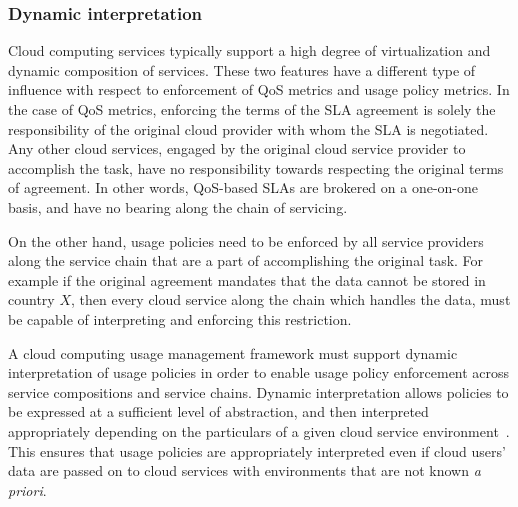 \documentclass[10pt, conference, compsocconf]{IEEEtran}
\begin{document}





\subsubsection{Dynamic interpretation}
Cloud computing services typically support a high degree of virtualization and dynamic composition of services. These two features have a different type of influence with respect to enforcement of QoS metrics and usage policy metrics. In the case of QoS metrics, enforcing the terms of the SLA agreement is solely the responsibility of the original cloud provider with whom the SLA is negotiated. Any other cloud services, engaged by the original cloud service provider to accomplish the task, have no responsibility towards respecting the original terms of agreement. In other words, QoS-based SLAs are brokered on a one-on-one basis, and have no bearing along the chain of servicing. 

On the other hand, usage policies need to be enforced by all service providers along the service chain that are a part of accomplishing the original task. For example if the original agreement mandates that the data cannot be stored in country $X$, then every cloud service along the chain which handles the data, must be capable of interpreting and enforcing this restriction. 

A cloud computing usage management framework must support dynamic interpretation of usage policies in order to enable usage policy enforcement across  service compositions and service chains. Dynamic interpretation allows policies to be expressed at a sufficient level of abstraction, and then interpreted appropriately depending on the particulars of a given cloud service environment~\cite{JaHeLa:10}. This ensures that usage policies are appropriately interpreted even if cloud users' data are passed on to cloud services with environments that are not known {\it a priori}. 
\end{document}
